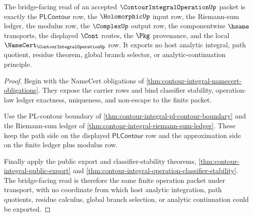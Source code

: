 \begin{theorem}
\label{thm:contour-integral-operation-bridge-envelope}
The bridge-facing read of an accepted $\ContourIntegralOperationUp$ packet is exactly the $\mathsf{PLContour}$ row, the $\HolomorphicUp$ input row, the Riemann-sum ledger, the modulus row, the $\ComplexUp$ output row, the componentwise $\hsame$ transports, the displayed $\Cont$ routes, the $\Pkg$ provenance, and the local $\NameCert_{\ContourIntegralOperationUp}$ row. It exports no host analytic integral, path quotient, residue theorem, global branch selector, or analytic-continuation principle.
\end{theorem}
\begin{proof}
Begin with the NameCert obligations of \autoref{thm:contour-integral-namecert-obligations}. They expose the carrier rows and bind classifier stability, operation-law ledger exactness, uniqueness, and non-escape to the finite packet.

Use the PL-contour boundary of \autoref{thm:contour-integral-pl-contour-boundary} and the Riemann-sum ledger of \autoref{thm:contour-integral-riemann-sum-ledger}. These keep the path side on the displayed $\mathsf{PLContour}$ row and the approximation side on the finite ledger plus modulus row.

Finally apply the public export and classifier-stability theorems, \autoref{thm:contour-integral-public-export} and \autoref{thm:contour-integral-operation-classifier-stability}. The bridge-facing read is therefore the same finite operation packet under transport, with no coordinate from which host analytic integration, path quotients, residue calculus, global branch selection, or analytic continuation could be exported.
\end{proof}


